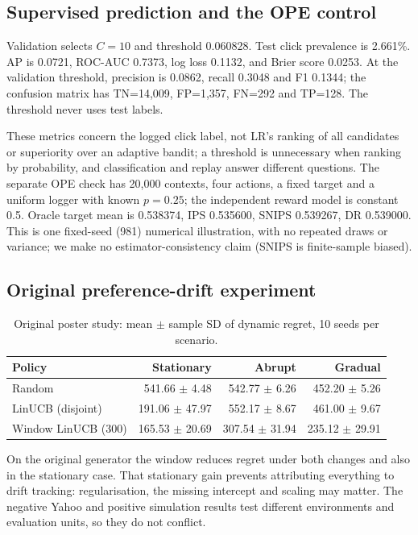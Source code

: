 \documentclass[10pt,a4paper]{article}
\begin{document}
\subsection{Supervised prediction and the OPE control}
Validation selects $C=10$ and threshold 0.060828. Test click prevalence is 2.661\%. AP is 0.0721, ROC-AUC 0.7373, log loss 0.1132, and Brier score 0.0253. At the validation threshold, precision is 0.0862, recall 0.3048 and F1 0.1344; the confusion matrix has TN=14,009, FP=1,357, FN=292 and TP=128. The threshold never uses test labels.

These metrics concern the logged click label, not LR's ranking of all
candidates or superiority over an adaptive bandit; a threshold is
unnecessary when ranking by probability, and classification and replay
answer different questions. The separate OPE check has 20,000 contexts,
four actions, a fixed target and a uniform logger with known $p=0.25$;
the independent reward model is constant 0.5. Oracle target mean is
0.538374, IPS 0.535600, SNIPS 0.539267, DR 0.539000. This is one fixed-seed (981) numerical illustration, with no repeated draws
or variance; we make no estimator-consistency claim (SNIPS is finite-sample
biased).

\subsection{Original preference-drift experiment}
\begin{table}[htbp]\centering\small\caption{Original poster study: mean $\pm$ sample SD of dynamic regret, 10 seeds per scenario.}\begin{tabular}{lrrr}
\toprule
Policy & Stationary & Abrupt & Gradual \\ \midrule
Random & 541.66 $\pm$ 4.48 & 542.77 $\pm$ 6.26 & 452.20 $\pm$ 5.26 \\
LinUCB (disjoint) & 191.06 $\pm$ 47.97 & 552.17 $\pm$ 8.67 & 461.00 $\pm$ 9.67 \\
Window LinUCB (300) & 165.53 $\pm$ 20.69 & 307.54 $\pm$ 31.94 & 235.12 $\pm$ 29.91 \\
\bottomrule\end{tabular}\end{table}

On the original generator the window reduces regret under both changes and
also in the stationary case. That stationary gain prevents attributing
everything to drift tracking: regularisation, the missing intercept and
scaling may matter. The negative Yahoo and positive simulation results
test different environments and evaluation units, so they do not conflict.
\end{document}

